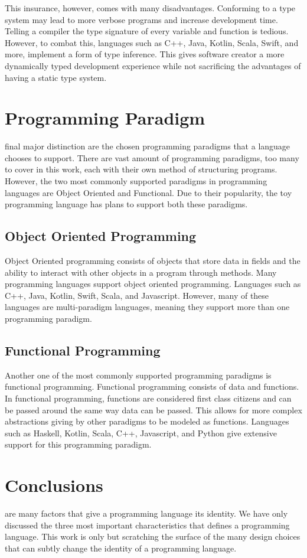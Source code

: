 \documentclass[./subfile.tex]{subfiles}
\begin{document}
            This insurance, however, comes with many disadvantages. Conforming to a type system may lead to more verbose programs and increase development time. Telling a compiler the type signature of every variable and function is tedious. However, to combat this, languages such as C++\cite{cppreference.com}, Java\cite{java_type_inference}, Kotlin\cite{akhin_belyaev}, Scala\cite{scala}, Swift\cite{swift}, and more, implement a form of type inference. This gives software creator a more dynamically typed development experience while not sacrificing the advantages of having a static type system.
    
    \section{Programming Paradigm}
         final major distinction are the chosen programming paradigms that a language chooses to support. There are vast amount of programming paradigms, too many to cover in this work, each with their own method of structuring programs. However, the two most commonly supported paradigms in programming languages are Object Oriented and Functional. Due to their popularity, the toy programming language has plans to support both these paradigms.
        
        \subsection{Object Oriented Programming}
            Object Oriented programming consists of objects that store data in fields and the ability to interact with other objects in a program through methods. Many programming languages support object oriented programming. Languages such as C++, Java, Kotlin, Swift, Scala, and Javascript. However, many of these languages are multi-paradigm languages, meaning they support more than one programming paradigm.
        
        \subsection{Functional Programming}
            Another one of the most commonly supported programming paradigms is functional programming. Functional programming consists of data and functions. In functional programming, functions are considered first class citizens and can be passed around the same way data can be passed. This allows for more complex abstractions giving by other paradigms to be modeled as functions. Languages such as Haskell, Kotlin, Scala, C++, Javascript, and Python give extensive support for this programming paradigm.
        
    \section{Conclusions}
         are many factors that give a programming language its identity. We have only discussed the three most important characteristics that defines a programming language. This work is only but scratching the surface of the many design choices that can subtly change the identity of a programming language.
    
    \printbibliography
\end{document}
